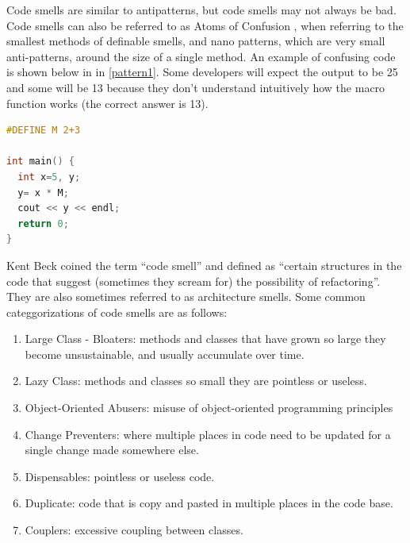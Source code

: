 \documentclass[conference]{IEEEtran}
\begin{document}
Code smells are similar to antipatterns, but code smells may not always be bad.
Code smells can also be referred to as Atoms of Confusion \cite{gopstein_understanding_2017}, when referring to the smallest methods of definable smells, and nano patterns, which are very small anti-patterns, around the size of a single method. 
An example of confusing code is shown below in in \ref{pattern1}.
Some developers will expect the output to be 25 and some will be 13 because they don't understand intuitively how the macro function works (the correct answer is 13).
\begin{minipage}{\linewidth}
\begin{lstlisting}[language=C,frame=single,caption=Example Atom of Confusion,label=pattern1]
#DEFINE M 2+3

int main() {
  int x=5, y;
  y= x * M;
  cout << y << endl;
  return 0;
}
\end{lstlisting}
\end{minipage}
Kent Beck coined the term ``code smell'' \cite{fowler_refactoring:_2018} and defined as ``certain structures in the code that suggest (sometimes they scream for) the possibility of refactoring''. They are also sometimes referred to as architecture smells.
Some common categgorizations of code smells are as follows:
\begin{enumerate}
\item Large Class - Bloaters: methods and classes that have grown so large they become unsustainable, and usually accumulate over time.
\item Lazy Class: methods and classes so small they are pointless or useless.
\item Object-Oriented Abusers: misuse of object-oriented programming principles
\item Change Preventers: where multiple places in code need to be updated for a single change made somewhere else.
\item Dispensables: pointless or useless code.
\item Duplicate: code that is copy and pasted in multiple places in the code base.
\item Couplers: excessive coupling between classes.
\end{enumerate}
\end{document}
